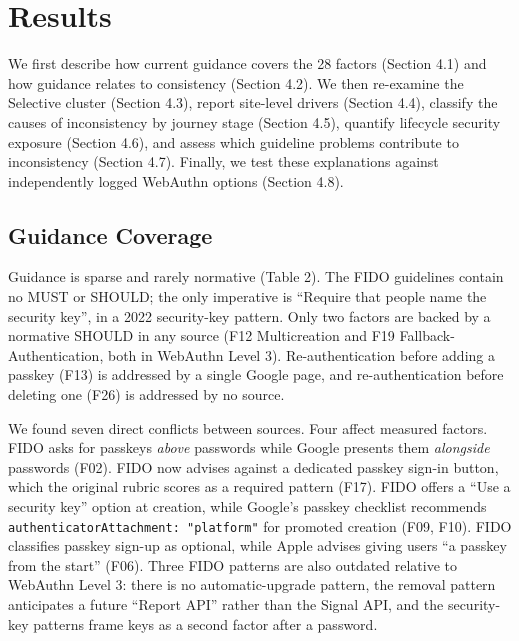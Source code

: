 \documentclass[letterpaper,twocolumn,10pt]{article}
\begin{document}
\section{Results}

We first describe how current guidance covers the 28 factors (Section 4.1) and how guidance relates to consistency (Section 4.2). We then re-examine the Selective cluster (Section 4.3), report site-level drivers (Section 4.4), classify the causes of inconsistency by journey stage (Section 4.5), quantify lifecycle security exposure (Section 4.6), and assess which guideline problems contribute to inconsistency (Section 4.7). Finally, we test these explanations against independently logged WebAuthn options (Section 4.8).

\subsection{Guidance Coverage}

Guidance is sparse and rarely normative (Table 2). The FIDO guidelines contain no MUST or SHOULD; the only imperative is ``Require that people name the security key'', in a 2022 security-key pattern. Only two factors are backed by a normative SHOULD in any source (F12 Multicreation and F19 Fallback-Authentication, both in WebAuthn Level 3). Re-authentication before adding a passkey (F13) is addressed by a single Google page, and re-authentication before deleting one (F26) is addressed by no source.

We found seven direct conflicts between sources. Four affect measured factors. FIDO asks for passkeys \emph{above} passwords while Google presents them \emph{alongside} passwords (F02). FIDO now advises against a dedicated passkey sign-in button, which the original rubric scores as a required pattern (F17). FIDO offers a ``Use a security key'' option at creation, while Google's passkey checklist recommends \texttt{authenticatorAttachment:\ "platform"} for promoted creation (F09, F10). FIDO classifies passkey sign-up as optional, while Apple advises giving users ``a passkey from the start'' (F06). Three FIDO patterns are also outdated relative to WebAuthn Level 3: there is no automatic-upgrade pattern, the removal pattern anticipates a future ``Report API'' rather than the Signal API, and the security-key patterns frame keys as a second factor after a password.
\end{document}
